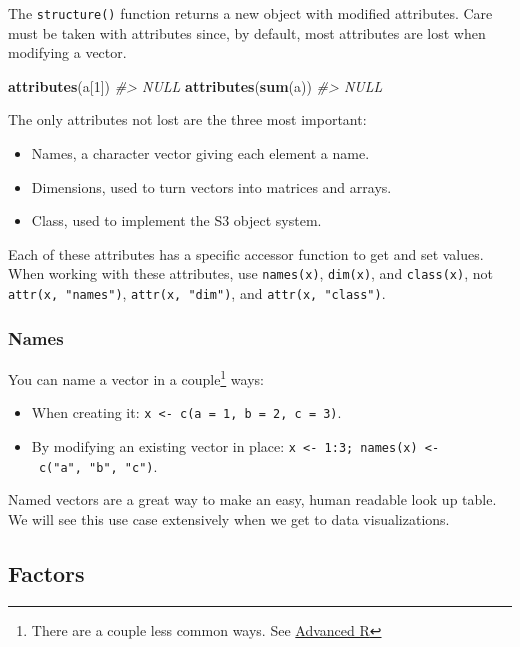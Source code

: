 \documentclass[]{book}
\newenvironment{Shaded}{\begin{snugshade}}{\end{snugshade}}
\newcommand{\KeywordTok}[1]{\textcolor[rgb]{0.13,0.29,0.53}{\textbf{#1}}}
\newcommand{\DecValTok}[1]{\textcolor[rgb]{0.00,0.00,0.81}{#1}}
\newcommand{\CommentTok}[1]{\textcolor[rgb]{0.56,0.35,0.01}{\textit{#1}}}
\newcommand{\NormalTok}[1]{#1}
\let\rmarkdownfootnote\footnote%
\def\footnote{\protect\rmarkdownfootnote}
\theoremstyle{definition}
\theoremstyle{definition}
\theoremstyle{definition}
\theoremstyle{remark}
\begin{document}
The \texttt{structure()} function returns a new object with modified
attributes. Care must be taken with attributes since, by default, most
attributes are lost when modifying a vector.

\begin{Shaded}
\begin{Highlighting}[]
\KeywordTok{attributes}\NormalTok{(a[}\DecValTok{1}\NormalTok{])}
\CommentTok{#> NULL}
\KeywordTok{attributes}\NormalTok{(}\KeywordTok{sum}\NormalTok{(a))}
\CommentTok{#> NULL}
\end{Highlighting}
\end{Shaded}

The only attributes not lost are the three most important:

\begin{itemize}
\item
  Names, a character vector giving each element a name.
\item
  Dimensions, used to turn vectors into matrices and arrays.
\item
  Class, used to implement the S3 object system.
\end{itemize}

Each of these attributes has a specific accessor function to get and set
values. When working with these attributes, use \texttt{names(x)},
\texttt{dim(x)}, and \texttt{class(x)}, not \texttt{attr(x,\ "names")},
\texttt{attr(x,\ "dim")}, and \texttt{attr(x,\ "class")}.

\subsubsection{Names}\label{names}

You can name a vector in a couple\footnote{There are a couple less
  common ways. See \href{http://adv-r.had.co.nz}{Advanced R}} ways:

\begin{itemize}
\item
  When creating it:
  \texttt{x\ \textless{}-\ c(a\ =\ 1,\ b\ =\ 2,\ c\ =\ 3)}.
\item
  By modifying an existing vector in place:
  \texttt{x\ \textless{}-\ 1:3;\ names(x)\ \textless{}-\ c("a",\ "b",\ "c")}.
\end{itemize}

Named vectors are a great way to make an easy, human readable look up
table. We will see this use case extensively when we get to data
visualizations.

\subsection{Factors}\label{factors}
\end{document}
